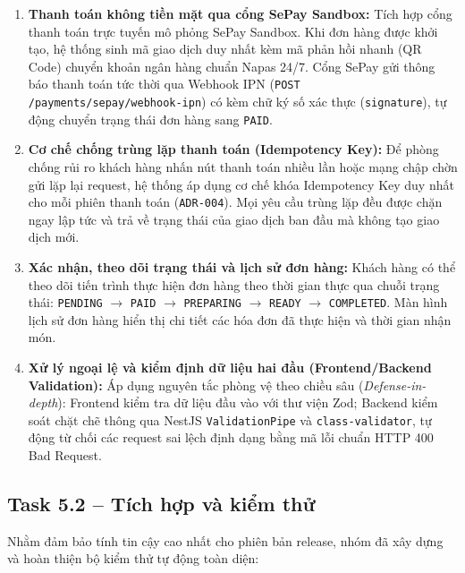 \documentclass[a4paper]{article}
\begin{document}
\begin{enumerate}
    \item \textbf{Thanh toán không tiền mặt qua cổng SePay Sandbox:}
    Tích hợp cổng thanh toán trực tuyến mô phỏng SePay Sandbox. Khi đơn hàng được khởi tạo, hệ thống sinh mã giao dịch duy nhất kèm mã phản hồi nhanh (QR Code) chuyển khoản ngân hàng chuẩn Napas 24/7. Cổng SePay gửi thông báo thanh toán tức thời qua Webhook IPN (\texttt{POST /payments/sepay/webhook-ipn}) có kèm chữ ký số xác thực (\texttt{signature}), tự động chuyển trạng thái đơn hàng sang \texttt{PAID}.

    \item \textbf{Cơ chế chống trùng lặp thanh toán (Idempotency Key):}
    Để phòng chống rủi ro khách hàng nhấn nút thanh toán nhiều lần hoặc mạng chập chờn gửi lặp lại request, hệ thống áp dụng cơ chế khóa Idempotency Key duy nhất cho mỗi phiên thanh toán (\texttt{ADR-004}). Mọi yêu cầu trùng lặp đều được chặn ngay lập tức và trả về trạng thái của giao dịch ban đầu mà không tạo giao dịch mới.

    \item \textbf{Xác nhận, theo dõi trạng thái và lịch sử đơn hàng:}
    Khách hàng có thể theo dõi tiến trình thực hiện đơn hàng theo thời gian thực qua chuỗi trạng thái: \texttt{PENDING} $\longrightarrow$ \texttt{PAID} $\longrightarrow$ \texttt{PREPARING} $\longrightarrow$ \texttt{READY} $\longrightarrow$ \texttt{COMPLETED}. Màn hình lịch sử đơn hàng hiển thị chi tiết các hóa đơn đã thực hiện và thời gian nhận món.

    \item \textbf{Xử lý ngoại lệ và kiểm định dữ liệu hai đầu (Frontend/Backend Validation):}
    Áp dụng nguyên tắc phòng vệ theo chiều sâu (\textit{Defense-in-depth}): Frontend kiểm tra dữ liệu đầu vào với thư viện Zod; Backend kiểm soát chặt chẽ thông qua NestJS \texttt{ValidationPipe} và \texttt{class-validator}, tự động từ chối các request sai lệch định dạng bằng mã lỗi chuẩn HTTP 400 Bad Request.
\end{enumerate}

\subsection{Task 5.2 – Tích hợp và kiểm thử}

Nhằm đảm bảo tính tin cậy cao nhất cho phiên bản release, nhóm đã xây dựng và hoàn thiện bộ kiểm thử tự động toàn diện:
\end{document}
